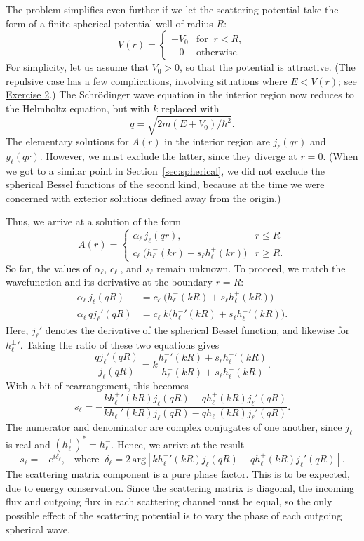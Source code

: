 \documentclass[pra,12pt]{revtex4}
\begin{document}
The problem simplifies even further if we let the scattering potential
take the form of a finite spherical potential well of radius $R$:
$$V(r) = \begin{cases}-V_0 &\mathrm{for}\;\; r < R, \\ \;\;\; 0 & \mathrm{otherwise}.\end{cases}$$
For simplicity, let us assume that $V_0 > 0$, so that the potential is
attractive.  (The repulsive case has a few complications, involving
situations where $E < V(r)$; see
\hyperref[ex:spherical_barrier]{Exercise 2}.)  The Schr\"odinger wave
equation in the interior region now reduces to the Helmholtz equation,
but with $k$ replaced with
$$q = \sqrt{2m(E+V_0)/\hbar^2}.$$
The elementary solutions for $A(r)$ in the interior region are
$j_\ell(qr)$ and $y_\ell(qr)$.  However, we must exclude the latter,
since they diverge at $r = 0$.  (When we got to a similar point in
Section~\ref{sec:spherical}, we did not exclude the spherical Bessel
functions of the second kind, because at the time we were concerned
with exterior solutions defined away from the origin.)

Thus, we arrive at a solution of the form
$$A(r) = \begin{cases} \alpha_\ell\, j_\ell(qr), & r \le R \\ c^-_\ell \Big(h^-_\ell(kr) + s_\ell h^+_\ell(kr)\Big) & r \ge R.\end{cases}$$
So far, the values of $\alpha_\ell$, $c^-_\ell$, and $s_\ell$ remain
unknown.  To proceed, we match the wavefunction and its
derivative at the boundary $r = R$:
$$\begin{aligned} \alpha_\ell\, j_\ell(qR) &= c^-_\ell \Big(h^-_\ell(kR) + s_\ell h^+_\ell(kR)\Big) \\ \alpha_\ell\, q j_\ell'(qR) &= c^-_\ell k \Big({h^-_\ell}'(kR) + s_\ell {h^+_\ell}'(kR)\Big).\end{aligned}$$
Here, $j_\ell'$ denotes the derivative of the spherical Bessel
function, and likewise for ${h_\ell^\pm}'$.  Taking the ratio of these
two equations gives
$$\frac{q j_\ell'(qR)}{j_\ell(qR)} = k \frac{{h^-_\ell}'(kR) + s_\ell {h^+_\ell}'(kR)}{h^-_\ell(kR) + s_\ell h^+_\ell(kR)}.$$
With a bit of rearrangement, this becomes
$$s_\ell = - \frac{k{h_\ell^+}'(kR) j_\ell(qR) - qh_\ell^+(kR)j_\ell'(qR)}{k{h_\ell^-}'(kR) j_\ell(qR) - qh_\ell^-(kR)j_\ell'(qR)}.$$
The numerator and denominator are complex conjugates of one another,
since $j_\ell$ is real and $(h_\ell^+)^* = h_\ell^-$.  Hence, we
arrive at the result
$$s_\ell = - e^{i\delta_\ell}, \;\;\;\mathrm{where}\;\; \delta_\ell = 2\,\mathrm{arg}\!\left[k{h_\ell^+}'(kR) j_\ell(qR) - qh_\ell^+(kR)j_\ell'(qR)\right].$$
The scattering matrix component is a pure phase factor.  This is to be
expected, due to energy conservation.  Since the scattering matrix is
diagonal, the incoming flux and outgoing flux in each scattering
channel must be equal, so the only possible effect of the scattering
potential is to vary the phase of each outgoing spherical wave.
\end{document}
